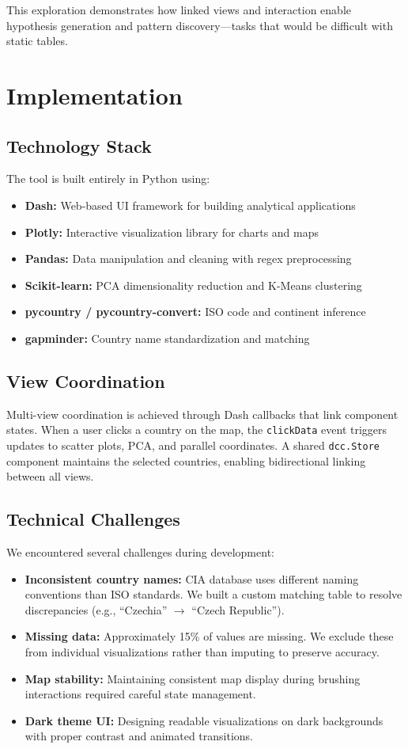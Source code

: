 \documentclass[conference]{IEEEtran}
\begin{document}
{This exploration demonstrates how linked views and interaction enable hypothesis generation and pattern discovery---tasks that would be difficult with static tables.
}

{
\color{blue}
\section{Implementation}

\subsection{Technology Stack}
The tool is built entirely in Python using:
\begin{itemize}
    \item \textbf{Dash:} Web-based UI framework for building analytical applications
    \item \textbf{Plotly:} Interactive visualization library for charts and maps
    \item \textbf{Pandas:} Data manipulation and cleaning with regex preprocessing
    \item \textbf{Scikit-learn:} PCA dimensionality reduction and K-Means clustering
    \item \textbf{pycountry / pycountry-convert:} ISO code and continent inference
    \item \textbf{gapminder:} Country name standardization and matching
\end{itemize}

\subsection{View Coordination}
Multi-view coordination is achieved through Dash callbacks that link component states. When a user clicks a country on the map, the \texttt{clickData} event triggers updates to scatter plots, PCA, and parallel coordinates. A shared \texttt{dcc.Store} component maintains the selected countries, enabling bidirectional linking between all views.

\subsection{Technical Challenges}
We encountered several challenges during development:
\begin{itemize}
    \item \textbf{Inconsistent country names:} CIA database uses different naming conventions than ISO standards. We built a custom matching table to resolve discrepancies (e.g., ``Czechia'' $\rightarrow$ ``Czech Republic'').
    \item \textbf{Missing data:} Approximately 15\% of values are missing. We exclude these from individual visualizations rather than imputing to preserve accuracy.
    \item \textbf{Map stability:} Maintaining consistent map display during brushing interactions required careful state management.
    \item \textbf{Dark theme UI:} Designing readable visualizations on dark backgrounds with proper contrast and animated transitions.
\end{itemize}

}
\end{document}
